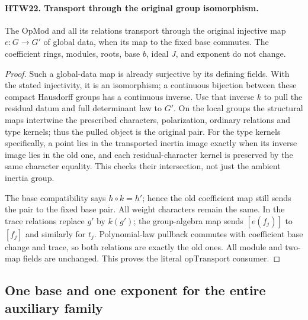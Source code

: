 \paragraph{HTW22. Transport through the original group isomorphism.}
\label{claim:HTW22}
The \(\mathrm{OpMod}\) and all its relations transport
through the original injective map \(e:G\to G'\)
of global data, when its map to the fixed base
commutes.  The coefficient rings, modules, roots,
base \(b\), ideal \(J\), and exponent do not change.
\begin{proof}
Such a global-data map is already surjective by
its defining fields.  With the stated injectivity,
it is an isomorphism; a continuous bijection
between these compact Hausdorff groups has a
continuous inverse.  Use that inverse \(k\) to
pull the residual datum and full determinant law
to \(G'\).  On the local groups the structural
maps intertwine the prescribed characters,
polarization, ordinary relations and type kernels;
thus the pulled object is the original pair.
For the type kernels specifically, a point lies
in the transported inertia image exactly when
its inverse image lies in the old one, and each
residual-character kernel is preserved by the
same character equality.  This checks their
intersection, not just the ambient inertia group.

The base compatibility says \(h\circ k=h'\);
hence the old coefficient map still sends the
pair to the fixed base pair.  All weight
characters remain the same.  In the trace
relations replace \(g'\) by \(k(g')\);
the group-algebra map sends \([e(f_j)]\) to
\([f_j]\) and similarly for \(t_j\).
Polynomial-law pullback commutes with coefficient
base change and trace, so both relations are
exactly the old ones.  All module and two-map
fields are unchanged.  This proves the literal
\(\mathrm{opTransport}\) consumer.
\end{proof}

\subsection{One base and one exponent for the entire auxiliary family}


